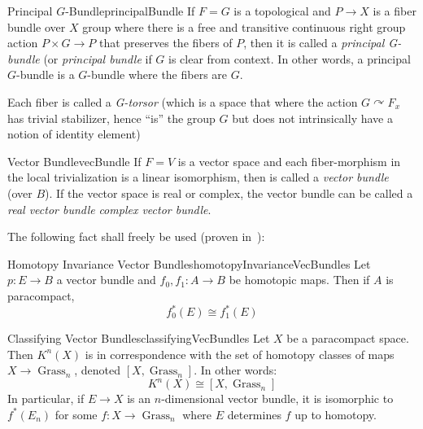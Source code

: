 \documentclass{book}
\newenvironment{Proof}[1][]
  {\begin{ProofTcb}[#1]}
  {\end{ProofTcb}}
\newcommand{\qn}{\quad\newline}
\newcommand{\Grass}{{\operatorname{Grass}}}
\newcommand{\actson}{\curvearrowright}
\begin{document}
\begin{defn}{Principal $G$-Bundle}{principalBundle}
	If $F = G$ is a topological and $P \to X$ is a fiber bundle over $X$ group where there is a free and
	transitive continuous
	right group action $P\times G \to P$ that preserves the fibers of $P$, then it is called a \emph{principal
	G-bundle} (or \emph{principal bundle} if $G$ is clear from context. In other words, a principal $G$-bundle
  is a $G$-bundle where the fibers are $G$.

	\qn
	Each fiber is called a \emph{G-torsor} (which is a space that where the action $G\actson F_x$ has trivial
	stabilizer, hence ``is'' the group $G$ but does not intrinsically have a notion of identity element)
\end{defn}

\begin{defn}{Vector Bundle}{vecBundle}
	If $F =V$ is a vector space and each
	fiber-morphism in the local trivialization is a linear isomorphism, then is called a \emph{vector bundle}
	(over $B$). If the vector space is real or complex, the vector bundle can be called a \emph{real vector
	bundle} \emph{complex vector bundle}.
\end{defn}

The following fact shall freely be used (proven in~\cite{NateKTheory}):

\begin{thm}{Homotopy Invariance Vector Bundles}{homotopyInvarianceVecBundles}
	Let $p: E \to B$ a vector bundle and $f_0,f_1: A \to B$ be homotopic maps. Then if $A$ is paracompact,
	\[
		f_0^*(E) \cong f_1^*(E)
	\]
\end{thm}

\begin{Proof}
  \cite[section~1.2]{NateKTheory}
\end{Proof}

\begin{thm}{Classifying Vector Bundles}{classifyingVecBundles}
	Let $X$ be a paracompact space. Then $K^n(X)$ is in correspondence with the set of homotopy
	classes of maps $X \to \Grass_n$, denoted $[X, \Grass_n]$. In other words:
	\[
		K^n(X) \cong [X,\Grass_n]
	\]
	In particular, if $E \to X$ is an $n$-dimensional vector bundle, it is isomorphic to $f^*(E_n)$ for some
	$f: X \to \Grass_n$ where $E$ determines $f$ up to homotopy.
\end{thm}
\end{document}
